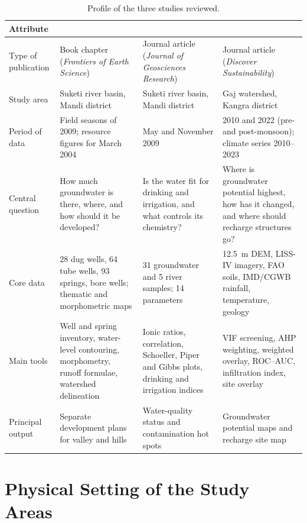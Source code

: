 \documentclass[10pt,a4paper,twocolumn]{article}
\begin{document}
\begin{table}[t]
\centering
\caption{Profile of the three studies reviewed.}
\label{tab:profile}
\small
\begin{tabularx}{\textwidth}{@{}P{2.9cm}LLL@{}}
\toprule
\textbf{Attribute} & \textbf{\citet{pophare2015}} & \textbf{\citet{pophare2018}} & \textbf{\citet{sharma2025}}\\
\midrule
Type of publication & Book chapter (\textit{Frontiers of Earth Science}) & Journal article (\textit{Journal of Geosciences Research}) & Journal article (\textit{Discover Sustainability})\\
Study area & Suketi river basin, Mandi district & Suketi river basin, Mandi district & Gaj watershed, Kangra district\\
Period of data & Field seasons of 2009; resource figures for March 2004 & May and November 2009 & 2010 and 2022 (pre- and post-monsoon); climate series 2010--2023\\
Central question & How much groundwater is there, where, and how should it be developed? & Is the water fit for drinking and irrigation, and what controls its chemistry? & Where is groundwater potential highest, how has it changed, and where should recharge structures go?\\
Core data & 28 dug wells, 64 tube wells, 93 springs, bore wells; thematic and morphometric maps & 31 groundwater and 5 river samples; 14 parameters & 12.5~m DEM, LISS-IV imagery, FAO soils, IMD/CGWB rainfall, temperature, geology\\
Main tools & Well and spring inventory, water-level contouring, morphometry, runoff formulae, watershed delineation & Ionic ratios, correlation, Schoeller, Piper and Gibbs plots, drinking and irrigation indices & VIF screening, AHP weighting, weighted overlay, ROC--AUC, infiltration index, site overlay\\
Principal output & Separate development plans for valley and hills & Water-quality status and contamination hot spots & Groundwater potential maps and recharge site map\\
\bottomrule
\end{tabularx}
\end{table}

\section{Physical Setting of the Study Areas}
\end{document}
